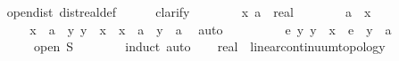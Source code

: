\begin{isabellebody}
\ \ \ \ \ \ \isamarkupfalse%
\ open{\isacharunderscore}{\kern0pt}dist\ dist{\isacharunderscore}{\kern0pt}real{\isacharunderscore}{\kern0pt}def\isanewline
\ \ \ \ \isamarkupfalse%
\ clarify\isanewline
\ \ \ \ \ \ \isamarkupfalse%
\ x\ a\ {\isacharcolon}{\kern0pt}{\isacharcolon}{\kern0pt}\ real\isanewline
\ \ \ \ \ \ \isamarkupfalse%
\ {\isachardoublequoteopen}a\ {\isacharless}{\kern0pt}\ x{\isachardoublequoteclose}\isanewline
\ \ \ \ \ \ \isamarkupfalse%
\ \isamarkupfalse%
\ {\isachardoublequoteopen}{}\ {\isacharless}{\kern0pt}\ x\ {\isacharminus}{\kern0pt}\ a\ {\isasymand}\ {\isacharparenleft}{\kern0pt}{\isasymforall}y{\isachardot}{\kern0pt}\ {\isasymbar}y\ {\isacharminus}{\kern0pt}\ x{\isasymbar}\ {\isacharless}{\kern0pt}\ x\ {\isacharminus}{\kern0pt}\ a\ {\isasymlongrightarrow}\ y\ {\isasymin}\ {\isacharbraceleft}{\kern0pt}a{\isacharless}{\kern0pt}{\isachardot}{\kern0pt}{\isachardot}{\kern0pt}{\isacharbraceright}{\kern0pt}{\isacharparenright}{\kern0pt}{\isachardoublequoteclose}\ \isamarkupfalse%
\ auto\isanewline
\ \ \ \ \ \ \isamarkupfalse%
\ \isamarkupfalse%
\ {\isachardoublequoteopen}{\isasymexists}e{\isachargreater}{\kern0pt}{}{\isachardot}{\kern0pt}\ {\isasymforall}y{\isachardot}{\kern0pt}\ {\isasymbar}y\ {\isacharminus}{\kern0pt}\ x{\isasymbar}\ {\isacharless}{\kern0pt}\ e\ {\isasymlongrightarrow}\ y\ {\isasymin}\ {\isacharbraceleft}{\kern0pt}a{\isacharless}{\kern0pt}{\isachardot}{\kern0pt}{\isachardot}{\kern0pt}{\isacharbraceright}{\kern0pt}{\isachardoublequoteclose}\ \isacommand{{\isachardot}{\kern0pt}{\isachardot}{\kern0pt}}\isamarkupfalse%
\isanewline
\ \ \ \ \isamarkupfalse%
\isanewline
\ \ \ \ \isamarkupfalse%
\ \isamarkupfalse%
\ {\isachardoublequoteopen}open\ S{\isachardoublequoteclose}\isanewline
\ \ \ \ \ \ \isamarkupfalse%
\ induct\ auto\isanewline
\ \ \isamarkupfalse%
\isanewline
{}\isamarkupfalse%
%
\endisatagproof
{\isafoldproof}%
%
\isadelimproof
\isanewline
%
\endisadelimproof
\isanewline
{}\isamarkupfalse%
\ real\ {\isacharcolon}{\kern0pt}{\isacharcolon}{\kern0pt}\ linear{\isacharunderscore}{\kern0pt}continuum{\isacharunderscore}{\kern0pt}topology%
\isadelimproof
\ %
\endisadelimproof
%
\isatagproof
\isacommand{{\isachardot}{\kern0pt}{\isachardot}{\kern0pt}}\isamarkupfalse%
%
\endisatagproof
{\isafoldproof}%
%
\isadelimproof
%
\endisadelimproof

\end{isabellebody}
